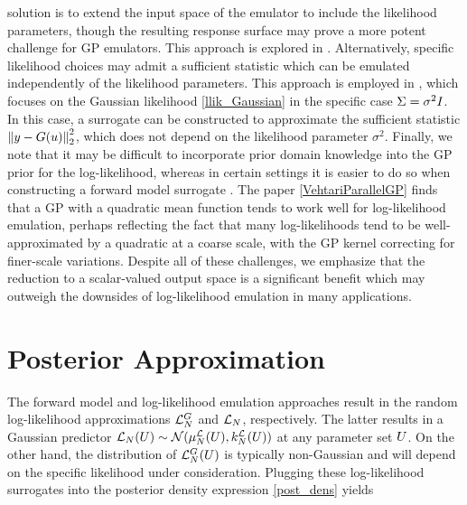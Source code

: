 \documentclass[12pt]{article}
\begin{document}
solution is to extend the input space of the emulator to include the likelihood parameters, though the resulting response surface 
may prove a more potent challenge for GP emulators. This approach is explored in \cite{llikRBF}. Alternatively, specific likelihood 
choices may admit a sufficient statistic which can be emulated independently of the likelihood parameters. This approach is employed 
in \cite{FerEmulation}, which focuses on the Gaussian likelihood \ref{llik_Gaussian} in the specific case $\likPar = \sigma^2 I$. In this 
case, a surrogate can be constructed to approximate the sufficient statistic $\norm{\obs - \fwd(\Par)}_2^2$, 
which does not depend on the likelihood parameter $\sigma^2$. 
Finally, we note that it may be difficult to incorporate prior domain knowledge 
into the GP prior for the log-likelihood, whereas in certain settings it is easier to do so when constructing a forward model 
surrogate \cite{GP_PDE_priors}. The paper \ref{VehtariParallelGP} finds that a GP with a quadratic mean function tends to 
work well for log-likelihood emulation, perhaps reflecting the fact that many log-likelihoods tend to be well-approximated by 
a quadratic at a coarse scale, with the GP kernel correcting for finer-scale variations. 
Despite all of these challenges, we emphasize that the reduction to a scalar-valued output space is a significant benefit which 
may outweigh the downsides of log-likelihood emulation in many applications. 

\section{Posterior Approximation}
The forward model and log-likelihood emulation approaches result in the random log-likelihood approximations 
$\llikEmFwd[\Ndesign]$ and $\llikEm[\Ndesign]$, respectively. The latter results in a Gaussian predictor 
$\llikEm[\Ndesign](\parMat) \sim \Gaussian(\emMean[\Ndesign]{\llik}(\parMat), \emKer[\Ndesign]{\llik}(\parMat))$ 
at any parameter set $\parMat$. On the other hand, the distribution of $\llikEmFwd[\Ndesign](\parMat)$ is 
typically non-Gaussian and will depend on the specific likelihood under consideration.
Plugging these log-likelihood surrogates into the posterior density expression \ref{post_dens} yields
\end{document}
